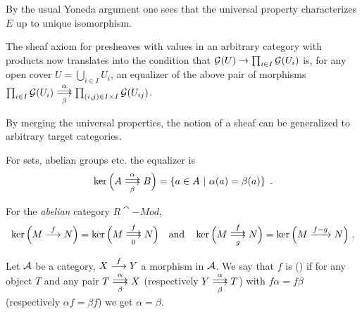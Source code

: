 \documentclass[a4paper,parskip=half,numbers=enddot, DIV=12]{scrreprt}
\begin{document}
	\begin{rem*}
		\begin{alphanumerate}
			\item By the usual Yoneda argument one sees that the universal property characterizes $E$ up to unique isomorphism.
			\item The sheaf axiom for presheaves with values in an arbitrary category with products now translates into the condition that $\mathcal{G}(U)\to\prod_{i\in I}\mathcal{G}(U_i)$ is, for any open cover $U=\bigcup_{i\in I}U_i$, an equalizer of the above pair of morphisms $\prod_{i\in I}\Gg(U_i)\doublemorphism[\alpha][\beta]\prod_{(i,j)\in I\times I}\Gg(U_{ij})$. 
			
			By merging the universal properties, the notion of a sheaf can be generalized to arbitrary target categories.
			\item For sets, abelian groups etc. the equalizer is 
			\begin{align*}
				\ker\Big(A\doublemorphism[\alpha][\beta]B\Big)=\left\{a\in A\st \alpha(a)=\beta(a)\right\}\;.
			\end{align*}
			\item For the \emph{abelian} category $R\cat{-Mod}$, 
			\begin{align*}
				\ker\Big(M\morphism[f]N\Big)=\ker\Big(M\doublemorphism[f][0]N\Big)\quad\text{and}\quad\ker\Big(M\doublemorphism[f][g]N\Big)=\ker\Big(M\xrightarrow{f-g}N\Big)\;.
			\end{align*}
		\end{alphanumerate}
	\end{rem*}
	\begin{defi}
		Let $\mathcal{A}$ be a category, $X\morphism[f] Y$ a morphism in $\mathcal{A}$. We say that $f$ is  () if for any object $T$ and any pair $T \doublemorphism[\alpha][\smash{\beta}] X$ (respectively $Y\doublemorphism[\smash{\alpha}][\beta] T$) with $f\alpha = f\beta$ (respectively $\alpha f= \beta f$) we get $\alpha =\beta$.
	\end{defi}
\end{document}
